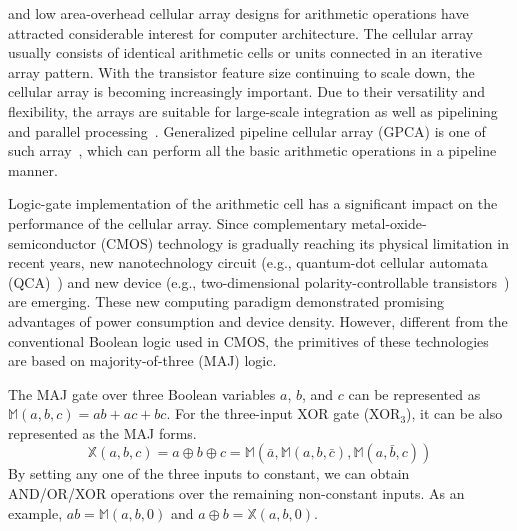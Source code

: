 \documentclass[9pt,journal,compsoc]{IEEEtran}
\begin{document}
\vspace{-2ex}
\maketitle
\IEEEdisplaynontitleabstractindextext
\IEEEpeerreviewmaketitle
{}%
 and low area-overhead cellular array designs for arithmetic operations have attracted considerable interest for computer architecture.
The cellular array usually consists of identical arithmetic cells or units connected in an iterative array pattern.
With the transistor feature size continuing to scale down, the cellular array is becoming increasingly important.
Due to their versatility and flexibility, the arrays are suitable for large-scale integration as well as pipelining and parallel processing~\cite{agrawal1979high,majithia1976some}.   
Generalized pipeline cellular array (GPCA) is one of such array~\cite{4}, which can perform all the basic arithmetic operations in a pipeline manner. 


Logic-gate implementation of the arithmetic cell has a significant impact on the performance of the cellular array.
Since complementary metal-oxide-semiconductor (CMOS) technology is gradually reaching its physical limitation in recent years, new nanotechnology circuit (e.g., quantum-dot cellular automata (QCA)~\cite{1}) and new device (e.g., two-dimensional polarity-controllable transistors~\cite{resta2018doping}) are emerging. 
These new computing paradigm demonstrated promising advantages of power consumption and device density. However, different from the conventional Boolean logic used in CMOS, the primitives of these technologies are based on majority-of-three (MAJ) logic. 

The MAJ gate over three Boolean variables $a$, $b$, and $c$ can be represented as $\mathbb{M}(a,b,c)=ab+ac+bc$.
For the three-input XOR gate (XOR$_3$), it can be also represented as the MAJ forms.  
\begin{equation}\label{equ_xor3}
\mathbb{X}(a,b,c)=a \oplus b \oplus c= \mathbb{M}(\bar a, \mathbb{M}(a,b,\bar c), \mathbb{M}(a,\bar b, c))
\end{equation} 
By setting any one of the three inputs to constant, we can obtain AND/OR/XOR operations over the remaining non-constant inputs.
As an example, $ab=\mathbb{M}(a,b,0)$ and $a\oplus b = \mathbb{X}(a,b,0)$. 
\end{document}

